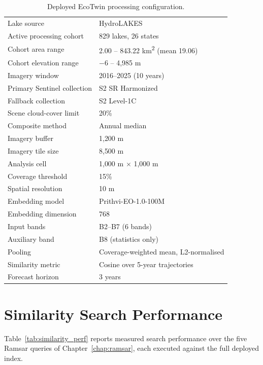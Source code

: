 \documentclass[12pt,a4paper,oneside]{report}
\begin{document}
\begin{longtable}{@{}l l@{}}
\caption{Deployed EcoTwin processing configuration.}
\label{tab:current_config} \\
\toprule
\endfirsthead
\toprule
\endhead
\bottomrule
\endfoot
Lake source & HydroLAKES \\
Active processing cohort & 829 lakes, 26 states \\
Cohort area range & 2.00 -- 843.22 \si{\kilo\meter\squared} (mean 19.06) \\
Cohort elevation range & $-6$ -- 4{,}985 m \\
Imagery window & 2016--2025 (10 years) \\
Primary Sentinel collection & S2 SR Harmonized \\
Fallback collection & S2 Level-1C \\
Scene cloud-cover limit & 20\% \\
Composite method & Annual median \\
Imagery buffer & 1{,}200 m \\
Imagery tile size & 8{,}500 m \\
Analysis cell & 1{,}000 m $\times$ 1{,}000 m \\
Coverage threshold & 15\% \\
Spatial resolution & 10 m \\
Embedding model & Prithvi-EO-1.0-100M \\
Embedding dimension & 768 \\
Input bands & B2--B7 (6 bands) \\
Auxiliary band & B8 (statistics only) \\
Pooling & Coverage-weighted mean, L2-normalised \\
Similarity metric & Cosine over 5-year trajectories \\
Forecast horizon & 3 years \\
\end{longtable}

\section{Similarity Search Performance}

Table~\ref{tab:similarity_perf} reports measured search performance
over the five Ramsar queries of Chapter~\ref{chap:ramsar}, each
executed against the full deployed index.
\end{document}
